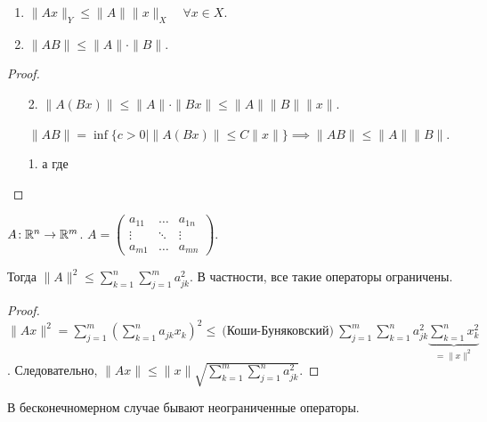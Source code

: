 \begin{consequence}
    \begin{enumerate}
        \item $\|Ax\|_Y \le \| A \| \|x\|_X \quad \forall x\in X$.
        \item $\| A B \| \le \|A \| \cdot \|B\|$.
    \end{enumerate}
\end{consequence}
\begin{proof}
    \begin{enumerate}
        \item[2.] $\|A(Bx)\| \le \|A\| \cdot \|Bx\| \le \| A \| \|B\| \|x \|$.

        $\|AB\| = \inf \{c > 0 \mid \|A(Bx)\| \le C\|x\|\} \implies \| AB\| \le \|A\|\|B\|$.

    \item[1.] а где
    \end{enumerate}
\end{proof}
\begin{theorem}
    $A\!: \mathbb{R}^n \to \mathbb{R}^m$.  $A = \begin{pmatrix} a_{11} & \ldots & a_{1n} \\ \vdots & \ddots & \vdots \\ a_{m1} & \ldots & a_{mn} \end{pmatrix}$.

    Тогда $\|A\|^2 \le \sum\limits_{k=1}^n \sum\limits_{j=1}^m a_{jk}^2$. В частности, все такие операторы ограничены.
\end{theorem}
\begin{proof}
    $\|Ax\|^2 = \sum\limits_{j=1}^m \left(\sum\limits_{k=1}^n a_{jk} x_k \right)^2 \le\ \text{(Коши-Буняковский)}\ \sum\limits_{j=1}^m \sum\limits_{k=1}^n a_{jk}^2 \underbrace{\sum\limits_{k=1}^n x_k^2}_{=\|x\|^2}$. Следовательно, $\|Ax\| \le \|x\| \sqrt{\sum\limits_{k=1}^m \sum\limits_{j=1}^n a_{jk}^2}$.
\end{proof}
\begin{remark}
    В бесконечномерном случае бывают неограниченные операторы.
\end{remark}
